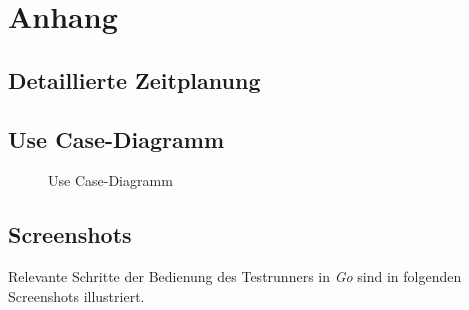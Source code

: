  \section{Anhang}
 \subsection{Detaillierte Zeitplanung}
 \label{app:Zeitplanung}



\clearpage
 \subsection{Use Case-Diagramm}\label{usecasediagram}

 \begin{figure}[htb]
 \centering
 \caption{Use Case-Diagramm}
  \label{app:UseCase}

 \end{figure}

% 

 \clearpage

 
 \clearpage

 \subsection{Screenshots}\label{screenshots}
 Relevante Schritte der Bedienung des Testrunners in \emph{Go} sind in folgenden Screenshots illustriert.


